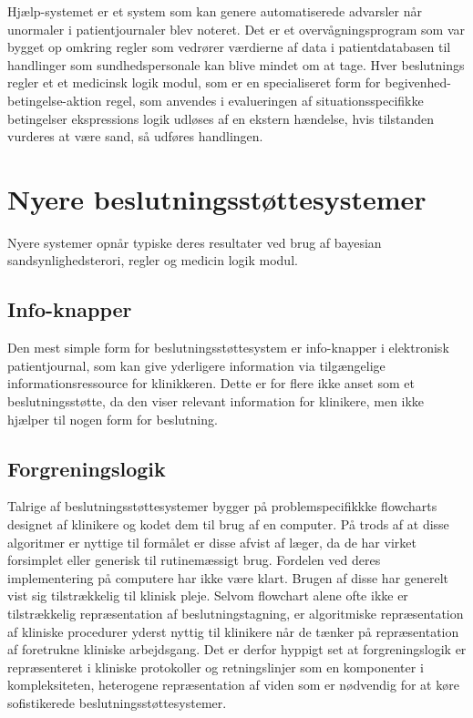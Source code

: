 Hjælp-systemet er et system som kan genere automatiserede advarsler når unormaler i patientjournaler blev noteret. Det er et overvågningsprogram som var bygget op omkring regler som vedrører værdierne af data i patientdatabasen til handlinger som sundhedspersonale kan blive mindet om at tage. Hver beslutnings regler et et medicinsk logik modul, som er en specialiseret form for begivenhed-betingelse-aktion regel, som anvendes i evalueringen af situationsspecifikke betingelser ekspressions logik udløses af en ekstern hændelse, hvis tilstanden vurderes at være sand, så udføres handlingen. 

\section{Nyere beslutningsstøttesystemer}
Nyere systemer opnår typiske deres resultater ved brug af bayesian sandsynlighedsterori, regler og medicin logik modul.

\subsection{Info-knapper}
Den mest simple form for beslutningsstøttesystem er info-knapper i elektronisk patientjournal, som kan give yderligere information via tilgængelige informationsressource for klinikkeren. Dette er for flere ikke anset som et beslutningsstøtte, da den viser relevant information for klinikere, men ikke hjælper til nogen form for beslutning. 

\subsection{Forgreningslogik}
Talrige af beslutningsstøttesystemer bygger på problemspecifikkke flowcharts designet af klinikere og kodet dem til brug af en computer. På trods af at disse algoritmer er nyttige til formålet er disse afvist af læger, da de har virket forsimplet eller generisk til rutinemæssigt brug. Fordelen ved deres implementering på computere har ikke være klart. Brugen af disse har generelt vist sig tilstrækkelig til klinisk pleje. Selvom flowchart alene ofte ikke er tilstrækkelig repræsentation af beslutningstagning, er algoritmiske repræsentation af kliniske procedurer yderst nyttig til klinikere når de tænker på repræsentation af foretrukne kliniske arbejdsgang. Det er derfor hyppigt set at forgreningslogik er repræsenteret i kliniske protokoller og retningslinjer som en komponenter i kompleksiteten, heterogene repræsentation af viden som er nødvendig for at køre sofistikerede beslutningsstøttesystemer.

